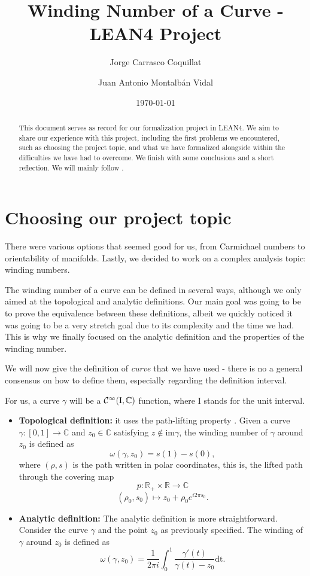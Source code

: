 \documentclass[a4paper,12pt]{article}
\title{Winding Number of a Curve - LEAN4 Project}
\author{Jorge Carrasco Coquillat \and
Juan Antonio Montalbán Vidal}
\date{\today} %
\begin{document}
\maketitle
{}
\begin{abstract}
This document serves as record for our formalization project in LEAN4. We aim to share our experience with this project, including the first problems we encountered,
such as choosing the project topic, and what we have formalized alongside within the difficulties we have had to
overcome. We finish with some conclusions and a short reflection. We will mainly follow \cite{COB22}.
\end{abstract}

\section{Choosing our project topic}
There were various options that seemed good for us, from Carmichael numbers
to orientability of manifolds. Lastly, we decided to work on a complex analysis topic: winding numbers.

The winding number of a curve can be defined in several ways, although we only aimed at the topological and analytic definitions. Our main goal was going to be
to prove the equivalence between these definitions, albeit we quickly noticed
it was going to be a very stretch goal due to its complexity and the time we had. This is why we finally focused on the analytic definition and the properties of the winding number. \par
We will now give the definition of \textit{curve} that we have used - there is no a general
consensus on how to define them, especially regarding the definition interval.

For us, a curve $\gamma$ will be a $\cal{C}^1 (\text{I}, \mathbb{C})$ function, where I stands for the unit interval.

\begin{itemize}
  \item \textbf{Topological definition:} it uses the path-lifting property \cite{sample2}. Given
  a curve $\gamma : [0, 1] \to \mathbb{C}$ and $z_0 \in \mathbb{C}$ satisfying $z \notin \text{im} \gamma$, the winding
  number of $\gamma$ around $z_0$ is defined as
  $$\omega (\gamma, z_0) = s(1) - s(0),$$
  where $(\rho, s)$ is the path written in polar coordinates, this is, the lifted path
  through the covering map
  $$p : \mathbb{R}_+ \times \mathbb{R} \to \mathbb{C}$$
  $$(\rho_0, s_0) \mapsto z_0 + \rho_0 e^{i2\pi s_0}.$$
  \item \textbf{Analytic definition:} The analytic definition is more straightforward. Consider the curve $\gamma$
  and the point $z_0$ as previously specified. The winding of $\gamma$ around $z_0$ is defined as
  $$\omega(\gamma, z_0) = \frac{1}{2\pi i} \int_{0}^{1} {\frac{\gamma'(t)}{\gamma(t)-z_0} \text{dt}}.$$
\end{itemize}
\end{document}
